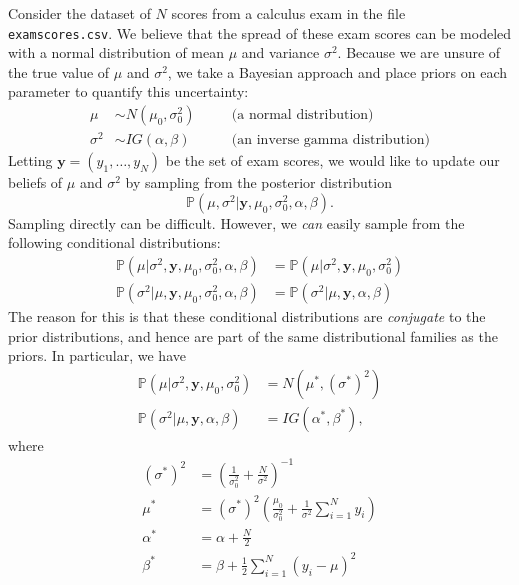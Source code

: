 Consider the dataset of $N$ scores from a calculus exam in the file \texttt{examscores.csv}. We believe that the spread of these exam scores can be
modeled with a normal distribution of mean $\mu$ and variance $\sigma^{2}$.
Because we are unsure of the true value of $\mu$ and $\sigma^2$, we take a Bayesian approach and place priors on each parameter to quantify this uncertainty:
\begin{align*}
\mu & \sim N(\mu_{0}, \sigma_{0}^{2})\quad &&\text{(a normal distribution)} \\
\sigma^{2} & \sim IG(\alpha, \beta) &&\text{(an inverse gamma distribution)}
\end{align*}
Letting $\mathbf{y} = (y_1,\ldots,y_N)$ be the set of exam scores, we would like to update our beliefs of $\mu$ and $\sigma^2$ by sampling from the posterior
distribution
\begin{equation*}
\mathbb{P}(\mu, \sigma^{2} | \mathbf{y}, \mu_{0}, \sigma_{0}^{2}, \alpha, \beta).
\end{equation*}
Sampling directly can be difficult. However, we \emph{can} easily sample from the following conditional distributions:
\begin{align*}
\mathbb{P}(\mu | \sigma^{2}, \mathbf{y}, \mu_{0}, \sigma_{0}^{2}, \alpha, \beta) & = \mathbb{P}(\mu | \sigma^{2}, \mathbf{y}, \mu_{0}, \sigma_{0}^{2})\\
\mathbb{P}(\sigma^{2} | \mu, \mathbf{y}, \mu_{0}, \sigma_{0}^{2}, \alpha, \beta) & = \mathbb{P}(\sigma^{2} | \mu, \mathbf{y}, \alpha, \beta)
\end{align*}
The reason for this is that these conditional distributions are \emph{conjugate} to the prior distributions, and hence are part of the same distributional
families as the priors. In particular, we have
\begin{align*}
\mathbb{P}(\mu | \sigma^{2}, \mathbf{y}, \mu_{0}, \sigma_{0}^{2}) &= N(\mu^*, (\sigma^*)^2)\\
\mathbb{P}(\sigma^{2} | \mu, \mathbf{y}, \alpha, \beta) &= IG(\alpha^*, \beta^*),
\end{align*}
where
\begin{align*}
(\sigma^*)^2 &= \left(\frac{1}{\sigma_0^2}+\frac{N}{\sigma^2}\right)^{-1}\\
\mu^* &= (\sigma^*)^2\left(\frac{\mu_0}{\sigma_0^2} + \frac{1}{\sigma^2}\sum_{i=1}^N y_i \right)\\
\alpha^* &= \alpha + \frac{N}{2}\\
\beta^* &= \beta + \frac{1}{2}\sum_{i=1}^N (y_i-\mu)^2
\end{align*}
